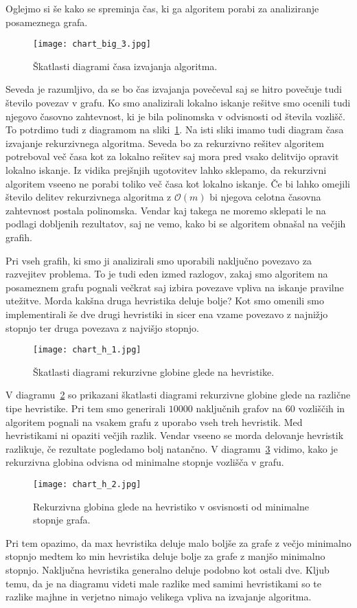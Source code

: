 \documentclass[12pt,a4paper,twoside]{article}
\theoremstyle{definition} %
\theoremstyle{plain} %
\numberwithin{equation}{section}  %
\begin{document}
Oglejmo si še kako se spreminja čas, ki ga algoritem porabi za analiziranje posameznega grafa.
 \begin{figure}[h!]
\caption{Škatlasti diagrami časa izvajanja algoritma.}
\label{chart_big_3}
\centering
    \texttt{[image: chart\_big\_3.jpg]}
    \end{figure}
Seveda je razumljivo, da se bo čas izvajanja povečeval saj se hitro povečuje tudi število povezav v grafu. Ko smo analizirali lokalno iskanje rešitve smo ocenili tudi njegovo časovno zahtevnost, ki je bila polinomska v odvisnosti od števila vozlišč. To potrdimo tudi z diagramom na sliki~\ref{chart_big_3}. Na isti sliki imamo tudi diagram časa izvajanje rekurzivnega algoritma. Seveda bo za rekurzivno rešitev algoritem potreboval več časa kot za lokalno rešitev saj mora pred vsako delitvijo opravit lokalno iskanje. Iz vidika prejšnjih ugotovitev lahko sklepamo, da rekurzivni algoritem vseeno ne porabi toliko več časa kot lokalno iskanje. Če bi lahko omejili število delitev rekurzivnega algoritma z $\mathcal{O}(m)$ bi njegova celotna časovna zahtevnost postala polinomska. Vendar kaj takega ne moremo sklepati le na podlagi dobljenih rezultatov, saj ne vemo, kako bi se algoritem obnašal na večjih grafih.

Pri vseh grafih, ki smo ji analizirali smo uporabili naključno povezavo za razvejitev problema. To je tudi eden izmed razlogov, zakaj smo algoritem na posameznem grafu pognali večkrat saj izbira povezave vpliva na iskanje pravilne utežitve. Morda kakšna druga hevristika deluje bolje? Kot smo omenili smo implementirali še dve drugi hevristiki in sicer ena vzame povezavo z najnižjo stopnjo ter druga povezava z najvišjo stopnjo. 
 \begin{figure}[h!]
\caption{Škatlasti diagrami rekurzivne globine glede na hevristike.}
\label{chart_h_1}
\centering
    \texttt{[image: chart\_h\_1.jpg]}
    \end{figure}
V diagramu~\ref{chart_h_1} so prikazani škatlasti diagrami rekurzivne globine glede na različne tipe hevristike. Pri tem smo generirali $10000$ naključnih grafov na $60$ vozliščih in algoritem pognali na vsakem grafu z uporabo vseh treh hevristik. Med hevristikami ni opaziti večjih razlik. Vendar vseeno se morda delovanje hevristik razlikuje, če rezultate pogledamo bolj natančno. V diagramu~\ref{chart_h_2} vidimo, kako je rekurzivna globina odvisna od minimalne stopnje vozlišča v grafu.
 \begin{figure}[h!]
\caption{Rekurzivna globina glede na hevristiko v osvisnosti od minimalne stopnje grafa.}
\label{chart_h_2}
\centering
    \texttt{[image: chart\_h\_2.jpg]}
    \end{figure}
Pri tem opazimo, da max hevristika deluje malo boljše za grafe z večjo minimalno stopnjo medtem ko min hevristika deluje bolje za grafe z manjšo  minimalno stopnjo. Naključna hevristika generalno deluje podobno kot ostali dve. Kljub temu, da je na diagramu videti male razlike med samimi hevristikami so te razlike majhne in verjetno nimajo velikega vpliva na izvajanje algoritma.
\end{document}
